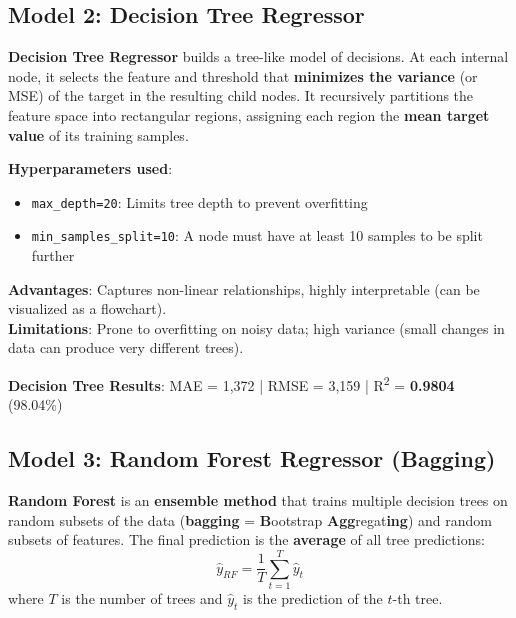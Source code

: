 \documentclass[12pt, a4paper]{article}
\newcommand{\rupee}{\text{₹}}
\begin{document}
\subsection{Model 2: Decision Tree Regressor}

\begin{keyterm}
\textbf{Decision Tree Regressor} builds a tree-like model of decisions. At each internal node, it selects the feature and threshold that \textbf{minimizes the variance} (or MSE) of the target in the resulting child nodes. It recursively partitions the feature space into rectangular regions, assigning each region the \textbf{mean target value} of its training samples.
\end{keyterm}

\textbf{Hyperparameters used}:
\begin{itemize}[leftmargin=*]
    \item \texttt{max\_depth=20}: Limits tree depth to prevent overfitting
    \item \texttt{min\_samples\_split=10}: A node must have at least 10 samples to be split further
\end{itemize}

\textbf{Advantages}: Captures non-linear relationships, highly interpretable (can be visualized as a flowchart). \\
\textbf{Limitations}: Prone to overfitting on noisy data; high variance (small changes in data can produce very different trees).

\begin{resultbox}
\textbf{Decision Tree Results}: MAE = \rupee1,372 \quad | \quad RMSE = \rupee3,159 \quad | \quad R\textsuperscript{2} = \textbf{0.9804} (98.04\%)
\end{resultbox}

\subsection{Model 3: Random Forest Regressor (Bagging)}

\begin{keyterm}
\textbf{Random Forest} is an \textbf{ensemble method} that trains multiple decision trees on random subsets of the data (\textbf{bagging} = \textbf{B}ootstrap \textbf{Agg}regat\textbf{ing}) and random subsets of features. The final prediction is the \textbf{average} of all tree predictions:
\[
    \hat{y}_{RF} = \frac{1}{T}\sum_{t=1}^{T} \hat{y}_t
\]
where $T$ is the number of trees and $\hat{y}_t$ is the prediction of the $t$-th tree.
\end{keyterm}
\end{document}
